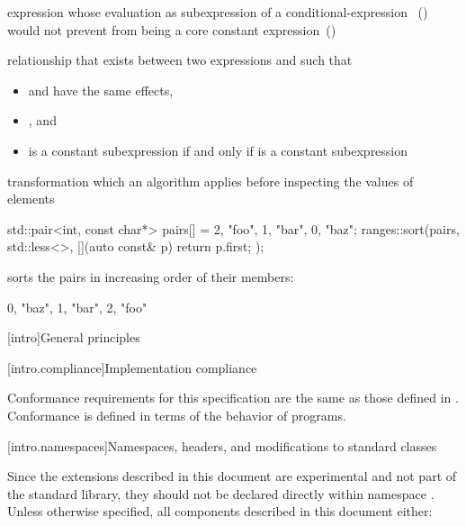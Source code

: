 %
expression whose evaluation as subexpression of a conditional-expression
~() would not prevent  from being a core
constant expression~()

%
relationship that exists between two expressions  and  such that
\begin{itemize}
\item
{} and  have the same effects,

\item
{}, and

\item
{} is a constant subexpression if and only if  is a constant subexpression
\end{itemize}

%
 transformation which an algorithm applies
before inspecting the values of elements

\enterexample
\begin{codeblock}
std::pair<int, const char*> pairs[] = {{2, "foo"}, {1, "bar"}, {0, "baz"}};
ranges::sort(pairs, std::less<>{}, [](auto const& p) { return p.first; });
\end{codeblock}
sorts the pairs in increasing order of their  members:
\begin{codeblock}
{{0, "baz"}, {1, "bar"}, {2, "foo"}}
\end{codeblock}
\exitexample

[intro]{General principles}

[intro.compliance]{Implementation compliance}

\pnum
Conformance requirements for this specification are the same as those
defined in .
\enternote
Conformance is defined in terms of the behavior of programs.
\exitnote

[intro.namespaces]{Namespaces, headers, and modifications to standard classes}

\pnum
Since the extensions described in this document are experimental and not
part of the \Cpp standard library, they should not be declared directly within namespace
. Unless otherwise specified, all components described in this document either:

